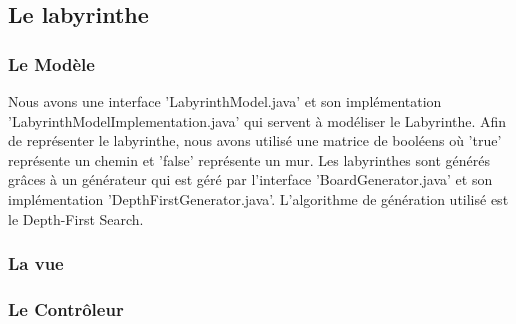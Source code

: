 \subsection{Le labyrinthe}
\label{subsec:labyrinthe}


\subsubsection{Le Modèle}

Nous avons une interface 'LabyrinthModel.java' et son implémentation 'LabyrinthModelImplementation.java' qui servent à modéliser le Labyrinthe. Afin de représenter le labyrinthe, nous avons utilisé une matrice de booléens où 'true' représente un chemin et 'false' représente un mur. Les labyrinthes sont générés grâces à un générateur qui est géré par l'interface 'BoardGenerator.java' et son implémentation 'DepthFirstGenerator.java'. L'algorithme de génération utilisé est le Depth-First Search.

\subsubsection{La vue}

\subsubsection{Le Contrôleur}








